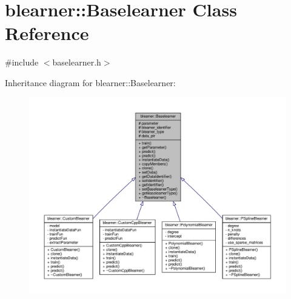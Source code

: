 \hypertarget{classblearner_1_1_baselearner}{}\section{blearner\+:\+:Baselearner Class Reference}
\label{classblearner_1_1_baselearner}


{\ttfamily \#include $<$baselearner.\+h$>$}



Inheritance diagram for blearner\+:\+:Baselearner\+:\nopagebreak
\begin{figure}[H]
\begin{center}
\leavevmode
\includegraphics[width=350pt]{classblearner_1_1_baselearner__inherit__graph}
\end{center}
\end{figure}


